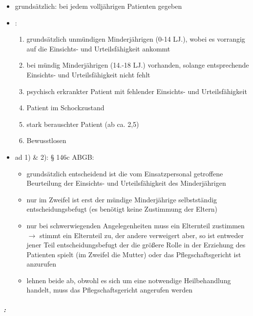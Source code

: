 	\begin{itemize}
	\item {\mdseries
	grundsätzlich: bei jedem volljährigen Patienten gegeben }

	\item {\mdseries
	: }


	\begin{enumerate}
		\item grundsätzlich unm\"undigen Minderjährigen (0-14 LJ.), wobei es vorrangig auf die Einsichts- und Urteilsfähigkeit ankommt

		\item bei m\"undig Minderjährigen (14.-18 LJ.) vorhanden, solange entsprechende Einsichts- und Urteilsfähigkeit nicht fehlt

		\item psychisch erkrankter Patient mit fehlender Einsichts- und Urteilsfähigkeit

		\item Patient im Schockzustand 

		\item stark berauschter Patient (ab ca. 2,5{\textperthousand})

		\item Bewusstlosen

	\end{enumerate}
\end{itemize}
\begin{itemize}
	\item[] ad 1) \& 2): {\S} 146c ABGB:


	\begin{itemize}
		\item grundsätzlich entscheidend ist die vom Einsatzpersonal getroffene
		Beurteilung der Einsichts- und Urteilsfähigkeit des Minderjährigen

		\item nur im Zweifel ist erst der m\"undige Minderjährige selbstständig
		entscheidungsbefugt (es ben\"otigt keine Zustimmung der Eltern) 

		\item nur bei schwerwiegenden Angelegenheiten muss ein Elternteil zustimmen
		${\rightarrow}$ stimmt ein Elternteil zu, der andere verweigert aber,
		so ist  entweder jener Teil entscheidungsbefugt der die gr\"o{\ss}ere
		Rolle in der Erziehung des Patienten spielt (im Zweifel
		die Mutter) oder das Pflegschaftsgericht ist anzurufen

		\item lehnen beide ab, obwohl es sich um eine notwendige Heilbehandlung handelt, muss das
		Pflegschaftsgericht angerufen werden
\end{itemize}
\end{itemize}
\subparagraph*{:}

